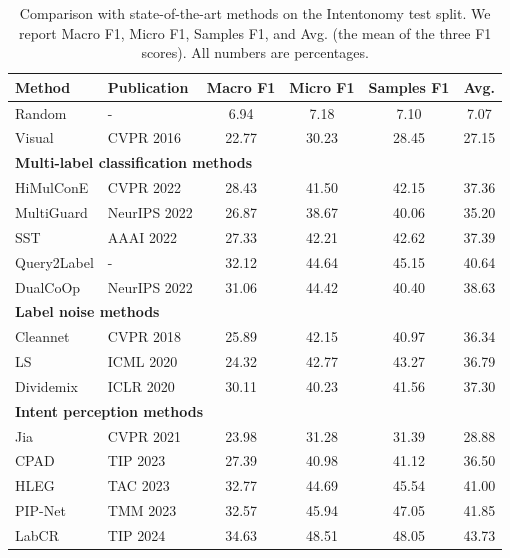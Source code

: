 \begin{table}[H]
\centering
\small
\caption{Comparison with state-of-the-art methods on the Intentonomy test split. We report Macro F1, Micro F1, Samples F1, and Avg. (the mean of the three F1 scores). All numbers are percentages.}
\label{tab:main_results}
\begingroup
\setlength{\tabcolsep}{4pt}
\begin{tabular}{llcccc}
\hline
Method & Publication & Macro F1 & Micro F1 & Samples F1 & Avg. \\
\hline
Random & - & 6.94 & 7.18 & 7.10 & 7.07 \\
Visual \cite{he_deep_2016} & CVPR 2016 & 22.77 & 30.23 & 28.45 & 27.15 \\
\hline
\multicolumn{6}{l}{\textbf{Multi-label classification methods}} \\
HiMulConE \cite{zhang_use_2022} & CVPR 2022 & 28.43 & 41.50 & 42.15 & 37.36 \\
MultiGuard \cite{jia_multiguard_2022} & NeurIPS 2022 & 26.87 & 38.67 & 40.06 & 35.20 \\
SST \cite{chen_structured_2022} & AAAI 2022 & 27.33 & 42.21 & 42.62 & 37.39 \\
Query2Label \cite{liu_query2label_2021} & - & 32.12 & 44.64 & 45.15 & 40.64 \\
DualCoOp \cite{sun_dualcoop_2022} & NeurIPS 2022 & 31.06 & 44.42 & 40.40 & 38.63 \\
\hline
\multicolumn{6}{l}{\textbf{Label noise methods}} \\
Cleannet \cite{lee_cleannet_2018} & CVPR 2018 & 25.89 & 42.15 & 40.97 & 36.34 \\
LS \cite{lukasik_does_2020} & ICML 2020 & 24.32 & 42.77 & 43.27 & 36.79 \\
Dividemix \cite{li_dividemix_2019} & ICLR 2020 & 30.11 & 40.23 & 41.56 & 37.30 \\
\hline
\multicolumn{6}{l}{\textbf{Intent perception methods}} \\
Jia \cite{jia_intentonomy_2021} & CVPR 2021 & 23.98 & 31.28 & 31.39 & 28.88 \\
CPAD \cite{ye_cross-modality_2023} & TIP 2023 & 27.39 & 40.98 & 41.12 & 36.50 \\
HLEG \cite{shi_learnable_2023} & TAC 2023 & 32.77 & 44.69 & 45.54 & 41.00 \\
PIP-Net \cite{wang_prototype-based_2023} & TMM 2023 & 32.57 & 45.94 & 47.05 & 41.85 \\
LabCR \cite{shi_label-aware_2024} & TIP 2024 & 34.63 & 48.51 & 48.05 & 43.73 \\

\end{tabular}
\end{table}
